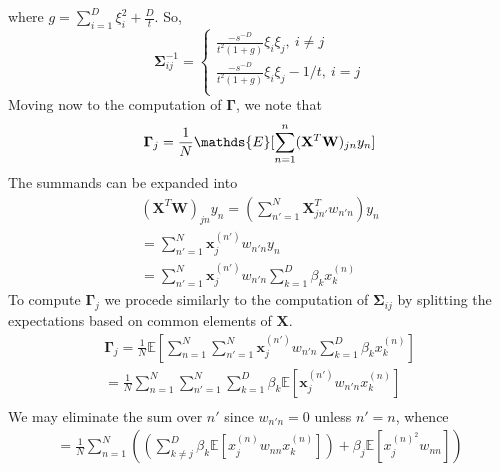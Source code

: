            where $g = \sum_{i=1}^D \xi_i^2 + \frac{D}{t}$.
           So, 
           $$
            \mathbf{\Sigma}_{ij}^{-1} =
            \begin{cases}
            \frac{-s^{-D}}{t^2(1+g)}\xi_i \xi_j ,\ i \neq j\\
           \frac{-s^{-D}}{t^2(1+g)}\xi_i \xi_j - 1/t,\ i = j\\
            \end{cases}
            $$           
            Moving now to the computation of $\mathbf{\Gamma}$, we note that
            \begin{equation*}
                \mathbf{\Gamma}_j = \frac{1}{N} \mathds{E}[ \sum_{n=1}^n (\mathbf{X}^T \mathbf{W})_{jn}y_n] \\
            \end{equation*}
            The summands can be expanded into
            \begin{gather*}
                (\mathbf{X}^T \mathbf{W})_{jn}y_n = (\sum_{n'=1}^N \mathbf{X}^T_{jn'} w_{n'n})y_n \\
                = \sum_{n'=1}^N \mathbf{x}^{(n')}_j w_{n'n} y_n \\
                = \sum_{n'=1}^N \mathbf{x}^{(n')}_j w_{n'n} \sum_{k=1}^D \beta_k x^{(n)}_k
            \end{gather*}
            To compute $\mathbf{\Gamma}_j$ we procede similarly to the computation of $\mathbf{\Sigma}_{ij}$ by splitting the expectations based on common elements of $\mathbf{X}$.
            \begin{gather*}
            \mathbf{\Gamma}_j = \frac{1}{N} \mathds{E}\left[\sum_{n=1}^N \sum_{n'=1}^N \mathbf{x}^{(n')}_j w_{n'n} \sum_{k=1}^D \beta_k x^{(n)}_k\right] \\
                = \frac{1}{N}\sum_{n=1}^N \sum_{n'=1}^N \sum_{k=1}^D \beta_k\mathds{E}[\mathbf{x}^{(n')}_jw_{n'n}x^{(n)}_k] \\
            \end{gather*}
            We may eliminate the sum over $n'$ since $w_{n'n}=0$ unless $n'=n$, whence
            \begin{gather*}
                = \frac{1}{N}\sum_{n=1}^N\left(\left(\sum_{k\neq j}^D\beta_k\mathds{E}[x^{(n)}_j w_{nn} x^{(n)}_k]\right) + \beta_j\mathds{E}[x^{{(n)}^2}_j w_{nn}]\right) \\
            \end{gather*}
